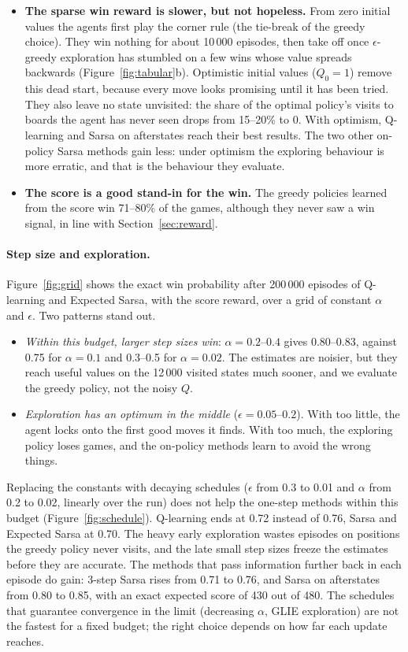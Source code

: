 \documentclass[11pt,a4paper]{article}
\theoremstyle{remark}
\begin{document}
\begin{itemize}[leftmargin=*]
\item \textbf{The sparse win reward is slower, but not hopeless.} From zero initial values the agents first play the corner rule (the tie-break of the greedy choice). They win nothing for about 10\,000 episodes, then take off once $\epsilon$-greedy exploration has stumbled on a few wins whose value spreads backwards (Figure~\ref{fig:tabular}b). Optimistic initial values ($Q_0=1$) remove this dead start, because every move looks promising until it has been tried. They also leave no state unvisited: the share of the optimal policy's visits to boards the agent has never seen drops from 15--20\% to 0. With optimism, Q-learning and Sarsa on afterstates reach their best results. The two other on-policy Sarsa methods gain less: under optimism the exploring behaviour is more erratic, and that is the behaviour they evaluate.
\item \textbf{The score is a good stand-in for the win.} The greedy policies learned from the score win 71--80\% of the games, although they never saw a win signal, in line with Section~\ref{sec:reward}.
\end{itemize}

\paragraph{Step size and exploration.} Figure~\ref{fig:grid} shows the exact win probability after 200\,000 episodes of Q-learning and Expected Sarsa, with the score reward, over a grid of constant $\alpha$ and $\epsilon$. Two patterns stand out.
\begin{itemize}[leftmargin=*]
\item \emph{Within this budget, larger step sizes win}: $\alpha=0.2$--$0.4$ gives 0.80--0.83, against 0.75 for $\alpha=0.1$ and 0.3--0.5 for $\alpha=0.02$. The estimates are noisier, but they reach useful values on the 12\,000 visited states much sooner, and we evaluate the greedy policy, not the noisy $Q$.
\item \emph{Exploration has an optimum in the middle} ($\epsilon=0.05$--$0.2$). With too little, the agent locks onto the first good moves it finds. With too much, the exploring policy loses games, and the on-policy methods learn to avoid the wrong things.
\end{itemize}
Replacing the constants with decaying schedules ($\epsilon$ from 0.3 to 0.01 and $\alpha$ from 0.2 to 0.02, linearly over the run) does not help the one-step methods within this budget (Figure~\ref{fig:schedule}). Q-learning ends at 0.72 instead of 0.76, Sarsa and Expected Sarsa at 0.70. The heavy early exploration wastes episodes on positions the greedy policy never visits, and the late small step sizes freeze the estimates before they are accurate. The methods that pass information further back in each episode do gain: 3-step Sarsa rises from 0.71 to 0.76, and Sarsa on afterstates from 0.80 to 0.85, with an exact expected score of 430 out of 480. The schedules that guarantee convergence in the limit (decreasing $\alpha$, GLIE exploration) are not the fastest for a fixed budget; the right choice depends on how far each update reaches.
\end{document}
